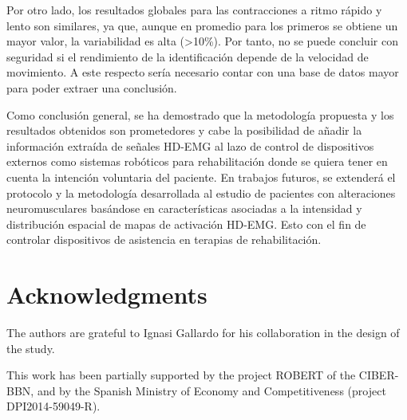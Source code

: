 Por otro lado, los resultados globales para las contracciones a ritmo rápido y lento son similares, ya que, aunque en promedio para los primeros se obtiene un mayor valor, la variabilidad es alta (>10\%). Por tanto, no se puede concluir con seguridad si el rendimiento de la identificación depende de la velocidad de movimiento. A este respecto sería necesario contar con una base de datos mayor para poder extraer una conclusión.

Como conclusión general, se ha demostrado que la metodología propuesta y los resultados obtenidos son prometedores y cabe la posibilidad de añadir la información extraída de señales HD-EMG al lazo de control de dispositivos externos como sistemas robóticos para rehabilitación donde se quiera tener en cuenta la intención voluntaria del paciente.
 En trabajos futuros, se extenderá el protocolo y la metodología desarrollada al estudio de pacientes con alteraciones neuromusculares basándose en características asociadas a la intensidad y distribución espacial de mapas de activación HD-EMG. Esto con el fin de controlar dispositivos de asistencia en terapias de rehabilitación.
 
 \section{Acknowledgments}
 The authors are grateful to Ignasi Gallardo for his collaboration in the design of the study.
 
 This work has been partially supported by the project ROBERT of the CIBER-BBN, and by the Spanish Ministry of Economy and Competitiveness (project DPI2014-59049-R).

